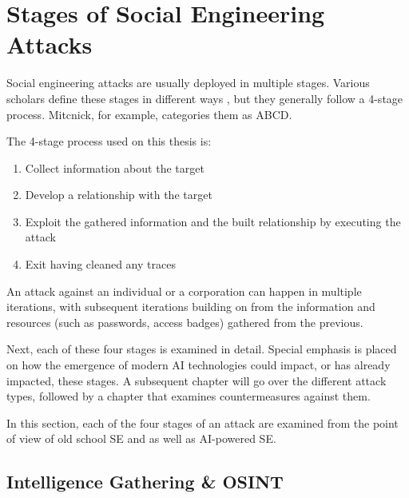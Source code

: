



\chapter{Stages of Social Engineering Attacks\label{stages}}

Social engineering attacks are usually deployed in multiple stages. Various scholars define these stages in different ways \citep{mouton_social_2016}, but they generally follow a 4-stage process. Mitcnick, for example, categories them as ABCD.

The 4-stage process used on this thesis is:

\begin{enumerate}
    \item Collect information about the target
    \item Develop a relationship with the target
    \item Exploit the gathered information and the built relationship by executing the attack
    \item Exit having cleaned any traces
\end{enumerate}

An attack against an individual or a corporation can happen in multiple iterations, with subsequent iterations building on from the information and resources (such as passwords, access badges) gathered from the previous.

Next, each of these four stages is examined in detail. Special emphasis is placed on how the emergence of modern AI technologies could impact, or has already impacted, these stages. A subsequent chapter will go over the different attack types, followed by a chapter that examines countermeasures against them.

In this section, each of the four stages of an attack are examined from the point of view of old school SE and as well as AI-powered SE.





\section{Intelligence Gathering \& OSINT}

